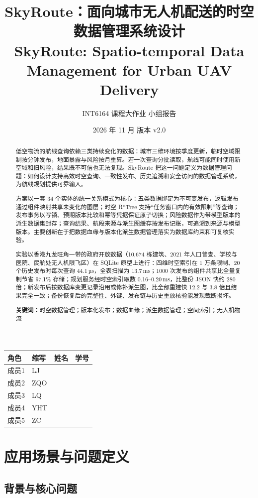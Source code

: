 \documentclass[a4paper,11pt,UTF8]{ctexart}
\title{\textbf{SkyRoute：面向城市无人机配送的时空数据管理系统设计}\\[0.6em]
\large SkyRoute: Spatio-temporal Data Management for Urban UAV Delivery}
\author{INT6164 课程大作业 \quad 小组报告}
\date{2026 年 11 月 \quad 版本 v2.0}
\newcommand{\memberrows}{%
成员1 & LJ  & \hspace{6em} & \hspace{8em} \\
成员2 & ZQO & & \\
成员3 & LQ  & & \\
成员4 & YHT & & \\
成员5 & ZC  & & \\
}
\begin{document}
\maketitle
\thispagestyle{empty}
\begin{center}
\small
\begin{tabular}{llll}
\toprule
角色 & 缩写 & 姓名 & 学号 \\
\midrule
\memberrows
\bottomrule
\end{tabular}
\end{center}
\clearpage

\begin{abstract}
低空物流的航线查询依赖三类持续变化的数据：城市三维环境按季度更新，临时空域限制按分钟发布，地面暴露与风险按月重算。若一次查询分批读取，航线可能同时使用新空域和旧风险，结果既不可信也无法复现。SkyRoute 把这一问题定义为数据管理问题：如何设计支持高效时空查询、一致性发布、历史追溯和安全访问的数据管理系统，为航线规划提供可靠输入。

方案以一套 34 个实体的统一关系模式为核心：五类数据绑定为不可变发布，逻辑发布通过组件映射共享未变化的图层；时空 R*Tree 支持“任务窗口内的有效限制”等查询；发布事务以写锁、预期版本比较和幂等凭据保证原子切换；风险数据作为带模型版本的派生数据集封存；查询结果、航段来源与派生图缓存按发布记账，可追溯到来源与模型版本。主要创新在于把数据血缘与版本化派生数据管理落实为数据库约束和可复核实验。

实验以香港九龙旺角一带的政府开放数据（10,674 栋建筑、2021 年人口普查、学校与医院、民航处无人机限飞区）在 SQLite 原型上进行：四维时空索引在 1 万条限制、20 个历史发布时每次查询 44.1\,µs，全表扫描为 13.7\,ms；1000 次发布的组件共享比全量复制节省 97.1\% 存储；规划服务经时空索引取数 0.16–0.20\,ms，比整份 JSON 快约 280 倍；新发布后按数据库变更记录沿用或修补派生图，比全部重建快 12.2 与 3.8 倍且结果完全一致；备份恢复后的完整性、外键、发布链与历史重放核验能发现截断损坏。

\noindent\textbf{关键词：}时空数据管理；版本化发布；数据血缘；派生数据管理；空间索引；无人机物流
\end{abstract}

\clearpage
{\small\linespread{0.95}\selectfont\tableofcontents}
\clearpage

\section{应用场景与问题定义}

\subsection{背景与核心问题}
\end{document}

